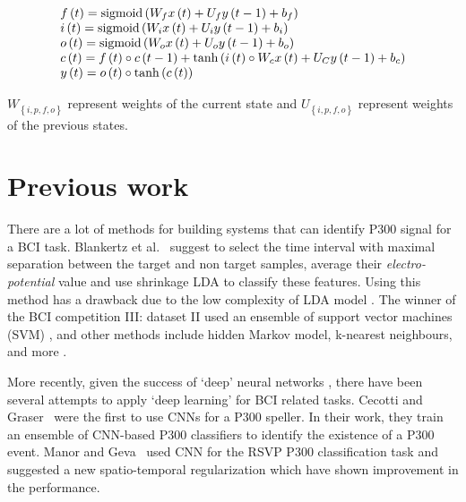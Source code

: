 \documentclass[
12pt, %
english, %
doublespacing, %
headsepline, %
]{MastersDoctoralThesis} %
\begin{document}
\begin{equation} \label{eq_lstm}
\begin{array}{l}
f\left( t \right) = {\rm{sigmoid}}\left( {{W_f}x\left( t \right) + {U_f}y\left( {t - 1} \right) + {b_f}} \right)\\
i\left( t \right) = {\rm{sigmoid}}\left( {{W_i}x\left( t \right) + {U_i}y\left( {t - 1} \right) + {b_i}} \right)\\
o\left( t \right) = {\rm{sigmoid}}\left( {{W_o}x\left( t \right) + {U_o}y\left( {t - 1} \right) + {b_o}} \right)\\
c\left( t \right) = f\left( t \right) \circ c\left( {t - 1} \right) + \tanh \left( {i\left( t \right) \circ {W_c}x\left( t \right) + {U_C}y\left( {t - 1} \right) + {b_c}} \right)\\
y\left( t \right) = o\left( t \right) \circ \tanh \left( {c\left( t \right)} \right)
\end{array}
\end{equation}

${W_{\left\{ {i,p,f,o} \right\}}}$ represent weights of the current state and  ${U_{\left\{ {i,p,f,o} \right\}}}$ represent weights of the previous states. 


\chapter{Previous work}
There are a lot of methods for building systems that can identify P300 signal for a BCI task. Blankertz et al.~\cite{P300_Tutorial} suggest to select the time interval with maximal separation between the target and non target samples, average their \textit{electro-potential} value and use shrinkage LDA to classify these features. Using this method has a drawback due to the low complexity of LDA model \cite{cincotti2003comparison}. The winner of the BCI competition III: dataset II used an ensemble of support vector machines (SVM) \cite{P300SVMWinner}, and other methods include hidden Markov model, k-nearest neighbours, and more  \cite{cincotti2003comparison}.

More recently, given the success of `deep' neural networks \cite{krizhevsky2012imagenet}, there have been several attempts to apply `deep learning' for BCI related tasks. Cecotti and Graser~\cite{P300_CNN} were the first to use CNNs  for a P300 speller. In their work, they train an ensemble of CNN-based P300 classifiers to identify the existence of a P300 event. Manor and Geva~\cite{RSVP_P300_geva} used CNN for the RSVP P300 classification task and suggested a new spatio-temporal regularization which have shown improvement in the performance.
\end{document}

